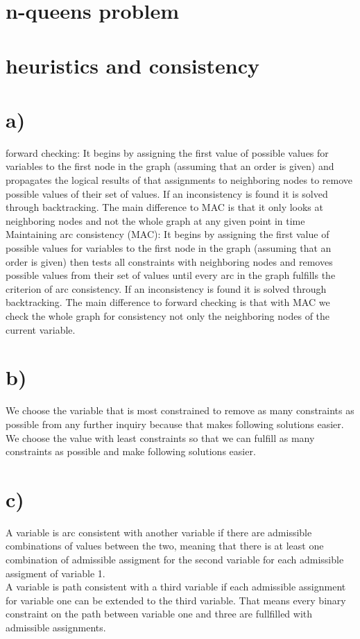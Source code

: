 \documentclass[a4paper]{article}
\begin{document}
\section{n-queens problem}

\section{heuristics and consistency}
\section*{a)}
forward checking: It begins by assigning the first value of possible values for variables to the first node in the graph (assuming that an order is given) and propagates the logical results of that assignments to neighboring nodes to remove possible values of their set of values. If an inconsistency is found it is solved through backtracking. The main difference to MAC is that it only looks at neighboring nodes and not the whole graph at any given point in time\\
Maintaining arc consistency (MAC): It begins by assigning the first value of possible values for variables to the first node in the graph (assuming that an order is given) then tests all constraints with neighboring nodes and removes possible values from their set of values until every arc in the graph fulfills the criterion of arc consistency. If an inconsistency is found it is solved through backtracking. The main difference to forward checking is that with MAC we check the whole graph for consistency not only the neighboring nodes of the current variable.
\section*{b)}
We choose the variable that is most constrained to remove as many constraints as possible from any further inquiry because that makes following solutions easier. \\
We choose the value with least constraints so that we can fulfill as many constraints as possible and make following solutions easier.
\section*{c)}
A variable is arc consistent with another variable if there are admissible combinations of values between the two, meaning that there is at least one combination of admissible assigment for the second variable for each admissible assigment of variable 1. \\
A variable is path consistent with a third variable if each admissible assignment for variable one can be extended to the third variable. That means every binary constraint on the path between variable one and three are fullfilled with admissible assignments.
\end{document}

